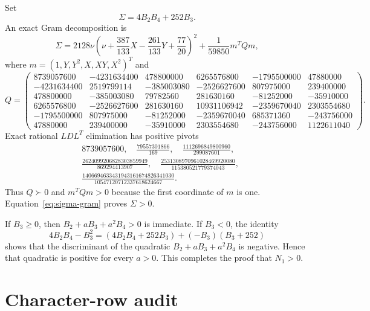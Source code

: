 \documentclass[11pt]{article}
\theoremstyle{definition}
\newcommand{\mat}[1]{\begin{pmatrix}#1\end{pmatrix}}
\newcommand{\pd}{\succ 0}
\begin{document}
Set
\[
 \Sigma=4B_2B_4+252B_3.
\]
An exact Gram decomposition is
\begin{equation}\label{eq:sigma-gram}
 \Sigma=2128\nu\left(\nu+\frac{387}{133}X-
 \frac{261}{133}Y+\frac{77}{20}\right)^2
 +\frac1{59850}m^TQm,
\end{equation}
where $m=(1,Y,Y^2,X,XY,X^2)^T$ and
\begingroup
\scriptsize
\[
Q=\mat{
8739057600&-4231634400&478800000&6265576800&-1795500000&47880000\\
-4231634400&2519799114&-385003080&-2526627600&807975000&239400000\\
478800000&-385003080&79782560&281630160&-81252000&-35910000\\
6265576800&-2526627600&281630160&10931106942&-2359670040&2303554680\\
-1795500000&807975000&-81252000&-2359670040&685371360&-243756000\\
47880000&239400000&-35910000&2303554680&-243756000&1122611040
}.
\]
\endgroup
Exact rational $LDL^T$ elimination has positive pivots
\begin{align*}
&8739057600,\quad \frac{79557301866}{169},\quad
\frac{1112696849800960}{299087601},\\
&\frac{2624099206828303859949}{869294413907},\quad
\frac{2531308970961028469920080}{115380521779374043},\\
&\frac{1406694633431943161674826341030}
{10547120712337618624667}.
\end{align*}
Thus $Q\pd$ and $m^TQm>0$ because the first coordinate of $m$ is one.
Equation~\eqref{eq:sigma-gram} proves $\Sigma>0$.

If $B_3\geq0$, then $B_2+aB_3+a^2B_4>0$ is immediate.  If $B_3<0$, the
identity
\[
 4B_2B_4-B_3^2=(4B_2B_4+252B_3)+(-B_3)(B_3+252)
\]
shows that the discriminant of the quadratic
$B_2+aB_3+a^2B_4$ is negative.  Hence that quadratic is positive for every
$a>0$.  This completes the proof that $N_1>0$.

\section{Character-row audit}
\end{document}
